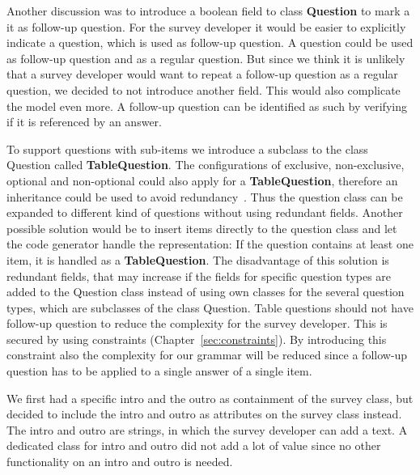 \documentclass[runningheads,a4paper]{llncs}
\begin{document}
Another discussion was to introduce a boolean field to class \textbf{Question} to mark a it as follow-up question. For the survey developer it would be easier to explicitly indicate a question, which is used as follow-up question. A question could be used as follow-up question and as a regular question. But since we think it is unlikely that a survey developer would want to repeat a follow-up question as a regular question, we decided to not introduce another field. This would also complicate the model even more. A follow-up question can be identified as such by verifying if it is referenced by an answer.

To support questions with sub-items we introduce a subclass to the class Question called \textbf{TableQuestion}. The configurations of exclusive, non-exclusive, optional and non-optional could also apply for a \textbf{TableQuestion}, therefore an inheritance could be used to avoid redundancy~\cite{karsai}. Thus the question class can be expanded to different kind of questions without using redundant fields. Another possible solution would be to insert items directly to the question class and let the code generator handle the representation: If the question contains at least one item, it is handled as a \textbf{TableQuestion}. The disadvantage of this solution is redundant fields, that may increase if the fields for specific question types are added to the Question class instead of using own classes for the several question types, which are subclasses of the class Question. Table questions should not have follow-up question to reduce the complexity for the survey developer. This is secured by using constraints (Chapter~\ref{sec:constraints}). By introducing this constraint also the complexity for our grammar will be reduced since a follow-up question has to be applied to a single answer of a single item.

We first had a specific intro and the outro as containment of the survey class, but decided to include the intro and outro as attributes on the survey class instead. The intro and outro are strings, in which the survey developer can add a text. A dedicated class for intro and outro did not add a lot of value since no other functionality on an intro and outro is needed.
\end{document}
